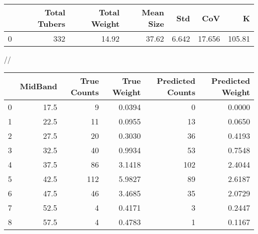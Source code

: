 \begin{tabular}{lrrrrrr}
\toprule
{} &  Total Tubers &  Total Weight &  Mean Size &    Std &     CoV &       K \\
\midrule
0 &           332 &         14.92 &      37.62 &  6.642 &  17.656 &  105.81 \\
\bottomrule
\end{tabular}
//\begin{tabular}{lrrrrr}
\toprule
{} &  MidBand &  True Counts &  True Weight &  Predicted Counts &  Predicted Weight \\
\midrule
0 &     17.5 &            9 &       0.0394 &                 0 &            0.0000 \\
1 &     22.5 &           11 &       0.0955 &                13 &            0.0650 \\
2 &     27.5 &           20 &       0.3030 &                36 &            0.4193 \\
3 &     32.5 &           40 &       0.9934 &                53 &            0.7548 \\
4 &     37.5 &           86 &       3.1418 &               102 &            2.4044 \\
5 &     42.5 &          112 &       5.9827 &                89 &            2.6187 \\
6 &     47.5 &           46 &       3.4685 &                35 &            2.0729 \\
7 &     52.5 &            4 &       0.4171 &                 3 &            0.2447 \\
8 &     57.5 &            4 &       0.4783 &                 1 &            0.1167 \\
\bottomrule
\end{tabular}
